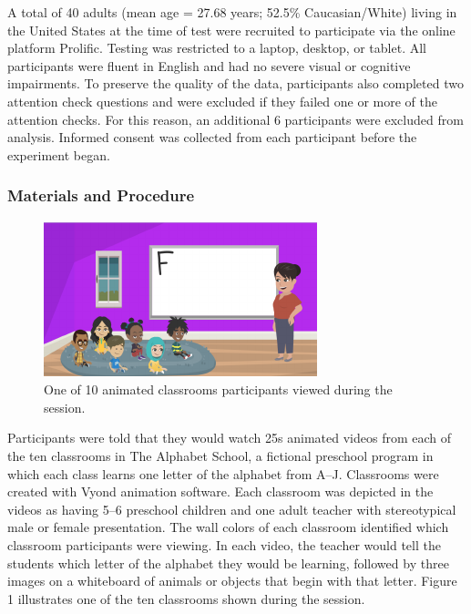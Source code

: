 \documentclass[10pt, letterpaper]{article}
\newenvironment{CodeChunk}{}{}
\begin{document}
A total of 40 adults (mean age = 27.68 years; 52.5\% Caucasian/White)
living in the United States at the time of test were recruited to
participate via the online platform Prolific. Testing was restricted to
a laptop, desktop, or tablet. All participants were fluent in English
and had no severe visual or cognitive impairments. To preserve the
quality of the data, participants also completed two attention check
questions and were excluded if they failed one or more of the attention
checks. For this reason, an additional 6 participants were excluded from
analysis. Informed consent was collected from each participant before
the experiment began.

\hypertarget{materials-and-procedure}{%
\subsubsection{Materials and Procedure}\label{materials-and-procedure}}

\begin{CodeChunk}
\begin{figure}[t]

{\centering \includegraphics{figs/e1-stimuli-1} 

}

\caption[One of 10 animated classrooms participants viewed during the session]{One of 10 animated classrooms participants viewed during the session.}\label{fig:e1-stimuli}
\end{figure}
\end{CodeChunk}

Participants were told that they would watch 25s animated videos from
each of the ten classrooms in The Alphabet School, a fictional preschool
program in which each class learns one letter of the alphabet from A--J.
Classrooms were created with Vyond animation software. Each classroom
was depicted in the videos as having 5--6 preschool children and one
adult teacher with stereotypical male or female presentation. The wall
colors of each classroom identified which classroom participants were
viewing. In each video, the teacher would tell the students which letter
of the alphabet they would be learning, followed by three images on a
whiteboard of animals or objects that begin with that letter. Figure 1
illustrates one of the ten classrooms shown during the session.
\end{document}
